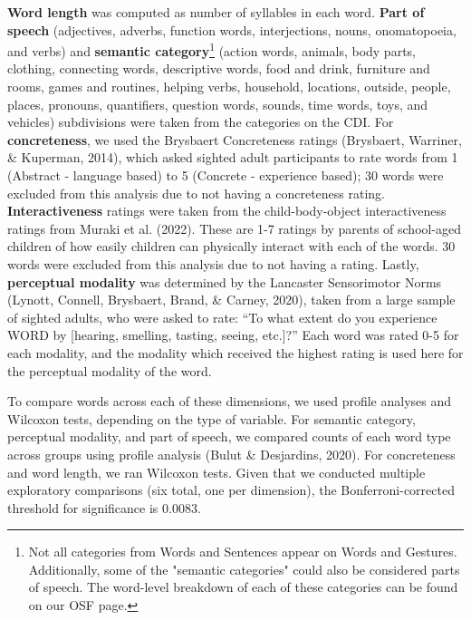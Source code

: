 \documentclass[
  man,floatsintext]{apa6}
\begin{document}
\textbf{Word length} was computed as number of syllables in each word. \textbf{Part of speech} (adjectives, adverbs, function words, interjections, nouns, onomatopoeia, and verbs) and \textbf{semantic category}\footnote{Not all categories from Words and Sentences appear on Words and Gestures. Additionally, some of the "semantic categories" could also be considered parts of speech. The word-level breakdown of each of these categories can be found on our OSF page.} (action words, animals, body parts, clothing, connecting words, descriptive words, food and drink, furniture and rooms, games and routines, helping verbs, household, locations, outside, people, places, pronouns, quantifiers, question words, sounds, time words, toys, and vehicles) subdivisions were taken from the categories on the CDI. For \textbf{concreteness}, we used the Brysbaert Concreteness ratings (Brysbaert, Warriner, \& Kuperman, 2014), which asked sighted adult participants to rate words from 1 (Abstract - language based) to 5 (Concrete - experience based); 30 words were excluded from this analysis due to not having a concreteness rating. \textbf{Interactiveness} ratings were taken from the child-body-object interactiveness ratings from Muraki et al. (2022). These are 1-7 ratings by parents of school-aged children of how easily children can physically interact with each of the words. 30 words were excluded from this analysis due to not having a rating. Lastly, \textbf{perceptual modality} was determined by the Lancaster Sensorimotor Norms (Lynott, Connell, Brysbaert, Brand, \& Carney, 2020), taken from a large sample of sighted adults, who were asked to rate: ``To what extent do you experience WORD by {[}hearing, smelling, tasting, seeing, etc.{]}?'' Each word was rated 0-5 for each modality, and the modality which received the highest rating is used here for the perceptual modality of the word.

To compare words across each of these dimensions, we used profile analyses and Wilcoxon tests, depending on the type of variable. For semantic category, perceptual modality, and part of speech, we compared counts of each word type across groups using profile analysis (Bulut \& Desjardins, 2020). For concreteness and word length, we ran Wilcoxon tests. Given that we conducted multiple exploratory comparisons (six total, one per dimension), the Bonferroni-corrected threshold for significance is 0.0083.
\end{document}
